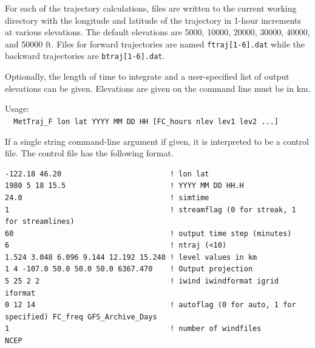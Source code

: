 \documentclass[11pt]{article}   %
\begin{document}
For each of the trajectory calculations, files are written to the current working directory
with the longitude and latitude of the trajectory in 1-hour increments at various
elevations.  The default elevations are 5000, 10000, 20000, 30000, 40000, and
50000 $\mathrm{ft}$.  Files for forward trajectories are named \texttt{ftraj[1-6].dat}
while the backward trajectories are  \texttt{btraj[1-6].dat}.

Optionally, the length of time to integrate and a user-specified list of output
elevations can be given.  Elevations are given on the command line must be in
$\mathrm{km}$.

Usage:\\
\verb|  MetTraj_F lon lat YYYY MM DD HH [FC_hours nlev lev1 lev2 ...]|

If a single string command-line argument if given, it is interpreted to be a control
file. The control file has the following format.

\footnotesize
\begin{verbatim}
-122.18 46.20                         ! lon lat
1980 5 18 15.5                        ! YYYY MM DD HH.H
24.0                                  ! simtime
1                                     ! streamflag (0 for streak, 1 for streamlines)
60                                    ! output time step (minutes)
6                                     ! ntraj (<10)
1.524 3.048 6.096 9.144 12.192 15.240 ! level values in km
1 4 -107.0 50.0 50.0 50.0 6367.470    ! Output projection
5 25 2 2                              ! iwind iwindformat igrid iformat
0 12 14                               ! autoflag (0 for auto, 1 for specified) FC_freq GFS_Archive_Days
1                                     ! number of windfiles
NCEP
\end{verbatim}
\normalsize
\end{document}
